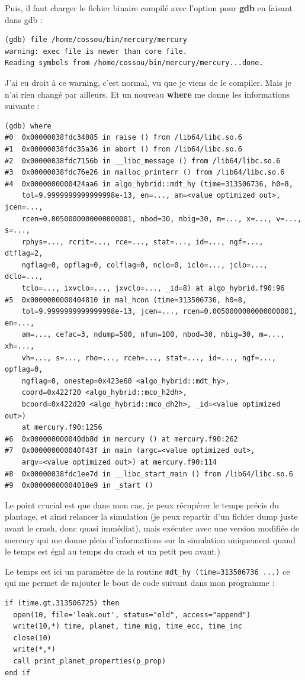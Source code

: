 \documentclass[a4paper,twoside]{article}
\begin{document}
Puis, il faut charger le fichier binaire compilé avec l'option pour \textbf{gdb} en faisant dans gdb :
\begin{verbatim}
(gdb) file /home/cossou/bin/mercury/mercury
warning: exec file is newer than core file.
Reading symbols from /home/cossou/bin/mercury/mercury...done.
\end{verbatim}
J'ai eu droit à ce warning, c'est normal, vu que je viens de le compiler. Mais je n'ai rien changé par ailleurs. Et un nouveau \textbf{where} me donne les informations suivante :
\begin{verbatim}
(gdb) where
#0  0x00000038fdc34085 in raise () from /lib64/libc.so.6
#1  0x00000038fdc35a36 in abort () from /lib64/libc.so.6
#2  0x00000038fdc7156b in __libc_message () from /lib64/libc.so.6
#3  0x00000038fdc76e26 in malloc_printerr () from /lib64/libc.so.6
#4  0x0000000000424aa6 in algo_hybrid::mdt_hy (time=313506736, h0=8, 
    tol=9.9999999999999998e-13, en=..., am=<value optimized out>, jcen=..., 
    rcen=0.0050000000000000001, nbod=30, nbig=30, m=..., x=..., v=..., s=..., 
    rphys=..., rcrit=..., rce=..., stat=..., id=..., ngf=..., dtflag=2, 
    ngflag=0, opflag=0, colflag=0, nclo=0, iclo=..., jclo=..., dclo=..., 
    tclo=..., ixvclo=..., jxvclo=..., _id=8) at algo_hybrid.f90:96
#5  0x0000000000404810 in mal_hcon (time=313506736, h0=8, 
    tol=9.9999999999999998e-13, jcen=..., rcen=0.0050000000000000001, en=..., 
    am=..., cefac=3, ndump=500, nfun=100, nbod=30, nbig=30, m=..., xh=..., 
    vh=..., s=..., rho=..., rceh=..., stat=..., id=..., ngf=..., opflag=0, 
    ngflag=0, onestep=0x423e60 <algo_hybrid::mdt_hy>, 
    coord=0x422f20 <algo_hybrid::mco_h2dh>, 
    bcoord=0x422d20 <algo_hybrid::mco_dh2h>, _id=<value optimized out>)
    at mercury.f90:1256
#6  0x000000000040db8d in mercury () at mercury.f90:262
#7  0x000000000040f43f in main (argc=<value optimized out>, 
    argv=<value optimized out>) at mercury.f90:114
#8  0x00000038fdc1ee7d in __libc_start_main () from /lib64/libc.so.6
#9  0x00000000004010e9 in _start ()
\end{verbatim}

\begin{important}
Le point crucial est que dans mon cas, je peux récupérer le temps précis du plantage, et ainsi relancer la simulation (je peux repartir d'un fichier dump juste avant le crash, donc quasi immédiat), mais exécuter avec une version modifiée de mercury qui me donne plein d'informations sur la simulation uniquement quand le temps est égal au temps du crash et un petit peu avant.)

Le temps est ici un paramètre de la routine \verb|mdt_hy (time=313506736 ...)| ce qui me permet de rajouter le bout de code suivant dans mon programme : 
\begin{verbatim}
if (time.gt.313506725) then
  open(10, file='leak.out', status="old", access="append")
  write(10,*) time, planet, time_mig, time_ecc, time_inc
  close(10)
  write(*,*)
  call print_planet_properties(p_prop)
end if
\end{verbatim}
\end{important}
\end{document}

